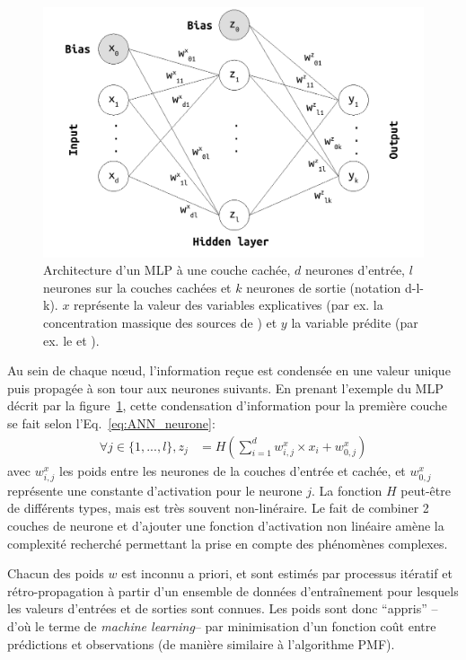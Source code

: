 \begin{figure}[ht]
    \centering
    \includegraphics[width=0.7\linewidth]{figures/chapter05/MLP_architecture.pdf}
    \caption{Architecture d'un MLP à une couche cachée, $d$ neurones d'entrée, $l$
    neurones sur la couches cachées et $k$ neurones de sortie (notation d-l-k). $x$
    représente la valeur des variables explicatives (par ex. la concentration massique des
    sources de \PMdix) et $y$ la variable prédite (par ex. le \POAAv{} et \PODTTv).}%
    \label{fig:MLP_architecture}
\end{figure}

Au sein de chaque nœud, l'information reçue est condensée en une valeur unique puis propagée à
son tour aux neurones suivants. En prenant l'exemple du MLP décrit par la
figure~\ref{fig:MLP_architecture}, cette condensation d'information pour la première
couche se fait selon l'Eq.~\ref{eq:ANN_neurone}:
\begin{align}
    \label{eq:ANN_neurone}
    \forall j \in \{1, ..., l\}, z_j &= H\left( \sum_{i=1}^d w^x_{i,j} \times x_i + w^x_{0,j} \right)
\end{align}
avec $w^x_{i,j}$ les poids entre les neurones de la couches d'entrée et cachée, et
$w^x_{0,j}$ représente une constante d'activation pour le neurone $j$. La fonction $H$
peut-être de différents types, mais est très souvent non-linéraire. Le fait de combiner 2
couches de neurone et d'ajouter une fonction d'activation non linéaire amène la
complexité recherché permettant la prise en compte des phénomènes complexes.

Chacun des poids $w$ est inconnu a priori, et sont estimés par processus itératif et
rétro-propagation à partir d'un ensemble de données d'entraînement pour lesquels les
valeurs d'entrées et de sorties sont connues. Les poids sont donc ``appris'' --d'où le
terme de \textit{machine learning}-- par minimisation d'un fonction coût entre prédictions
et observations (de manière similaire à l'algorithme PMF).

